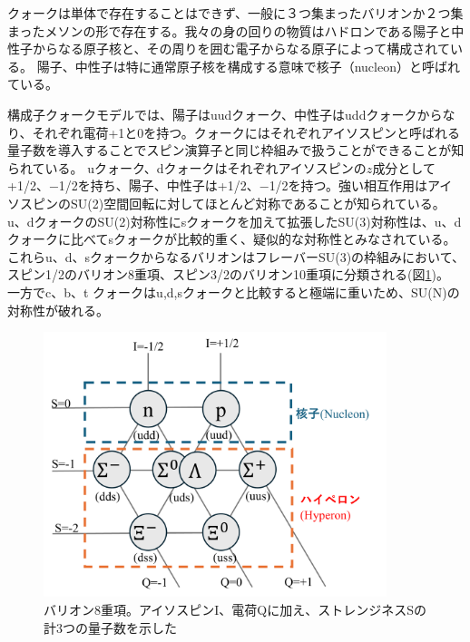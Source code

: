 \documentclass[a4paper,11pt,uplatex]{jsbook}
\begin{document}
クォークは単体で存在することはできず、一般に３つ集まったバリオンか２つ集まったメソンの形で存在する。我々の身の回りの物質はハドロンである陽子と中性子からなる原子核と、その周りを囲む電子からなる原子によって構成されている。
陽子、中性子は特に通常原子核を構成する意味で核子（nucleon）と呼ばれている。

構成子クォークモデルでは、陽子はuudクォーク、中性子はuddクォークからなり、それぞれ電荷+1と0を持つ。クォークにはそれぞれアイソスピンと呼ばれる量子数を導入することでスピン演算子と同じ枠組みで扱うことができることが知られている。
uクォーク、dクォークはそれぞれアイソスピンの$z$成分として+1/2、$-$1/2を持ち、陽子、中性子は+1/2、$-$1/2を持つ。強い相互作用はアイソスピンのSU(2)空間回転に対してほとんど対称であることが知られている。
u、dクォークのSU(2)対称性にsクォークを加えて拡張したSU(3)対称性は、u、dクォークに比べてsクォークが比較的重く、疑似的な対称性とみなされている。
これらu、d、sクォークからなるバリオンはフレーバーSU(3)の枠組みにおいて、スピン1/2のバリオン8重項、スピン3/2のバリオン10重項に分類される(図\ref{fig:baryon})。
一方でc、b、t クォークはu,d,sクォークと比較すると極端に重いため、SU(N)の対称性が破れる。
\begin{figure}[h]
  \centering
  \includegraphics[width=10cm]{image/1_baryon.png}
  \caption[バリオン8重項]{バリオン8重項。アイソスピンI、電荷Qに加え、ストレンジネスSの計3つの量子数を示した}
  \label{fig:baryon}
\end{figure}
\end{document}
